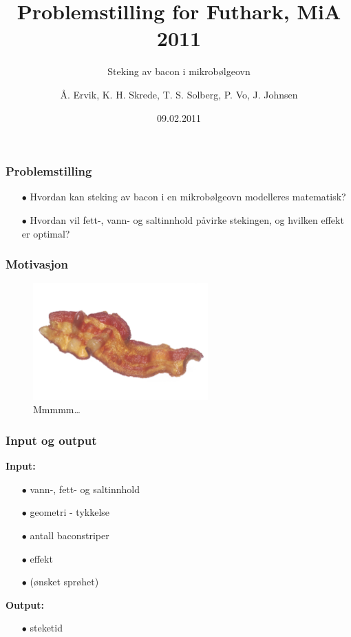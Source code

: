 \documentclass[screen]{beamer}
\title[Problemstilling MiA]{Problemstilling for Futhark, MiA 2011}
\subtitle{Steking av bacon i mikrobølgeovn}
\author[Futhark]{Å. Ervik, K. H. Skrede, T. S. Solberg, P. Vo, J. Johnsen}
\institute[NTNU]{Eksperter i Team, NTNU}
\date{09.02.2011}
\begin{document}
\ntnutitlepage

\begin{frame}
  \frametitle{Problemstilling}
  \begin{center}
  \begin{itemize}  
  \item[$\bullet$] Hvordan kan steking av bacon i en mikrobølgeovn modelleres matematisk? 
  \item[$\bullet$] Hvordan vil fett-, vann- og saltinnhold påvirke stekingen, og hvilken effekt er optimal? 
  \end{itemize}
  \end{center}
\end{frame}

\begin{frame}
  \frametitle{Motivasjon}
  \begin{center}
  \begin{figure}[!h]
    \begin{center}
      \includegraphics[width=0.6\textwidth]{bacon.png}
    \end{center}
    \caption{Mmmmm\ldots}
  \end{figure}
  \end{center}
\end{frame}


\begin{frame}
  \frametitle{Input og output}
  \textbf{Input:}
  \begin{itemize}
  \item[$\bullet$] vann-, fett- og saltinnhold
  \item[$\bullet$] geometri - tykkelse
  \item[$\bullet$] antall baconstriper
  \item[$\bullet$] effekt
  \item[$\bullet$] (ønsket sprøhet)
  \end{itemize}
  \textbf{Output:}
  \begin{itemize}
    \item[$\bullet$] steketid
  \end{itemize}
\end{frame}
\end{document}
